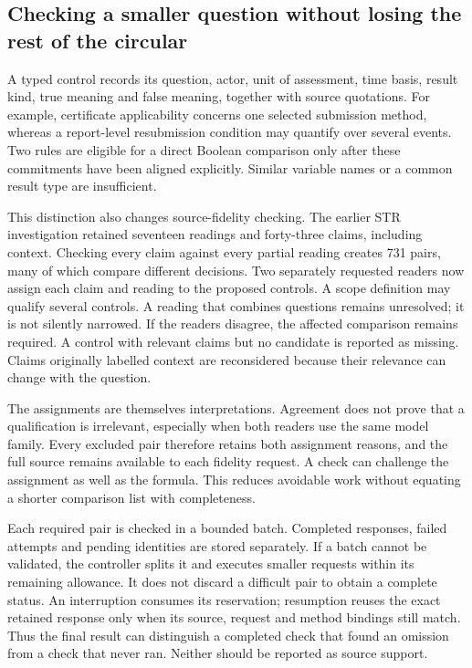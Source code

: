 \documentclass[12pt,a4paper,oneside,openany]{book}
\begin{document}
\subsection{Checking a smaller question without losing the rest of the circular}

A typed control records its question, actor, unit of assessment, time basis,
result kind, true meaning and false meaning, together with source quotations.
For example, certificate applicability concerns one selected submission method,
whereas a report-level resubmission condition may quantify over several events.
Two rules are eligible for a direct Boolean comparison only after these
commitments have been aligned explicitly. Similar variable names or a common
result type are insufficient.

This distinction also changes source-fidelity checking. The earlier STR
investigation retained seventeen readings and forty-three claims, including
context. Checking every claim against every partial reading creates 731 pairs,
many of which compare different decisions. Two separately requested readers now
assign each claim and reading to the proposed controls. A scope definition may
qualify several controls. A reading that combines questions remains unresolved;
it is not silently narrowed. If the readers disagree, the affected comparison
remains required. A control with relevant claims but no candidate is reported
as missing. Claims originally labelled context are reconsidered because their
relevance can change with the question.

The assignments are themselves interpretations. Agreement does not prove that
a qualification is irrelevant, especially when both readers use the same model
family. Every excluded pair therefore retains both assignment reasons, and the
full source remains available to each fidelity request. A check can challenge
the assignment as well as the formula. This reduces avoidable work without
equating a shorter comparison list with completeness.

Each required pair is checked in a bounded batch. Completed responses, failed
attempts and pending identities are stored separately. If a batch cannot be
validated, the controller splits it and executes smaller requests within its
remaining allowance. It does not discard a difficult pair to obtain a complete
status. An interruption consumes its reservation; resumption reuses the exact
retained response only when its source, request and method bindings still match.
Thus the final result can distinguish a completed check that found an omission
from a check that never ran. Neither should be reported as source support.
\end{document}

